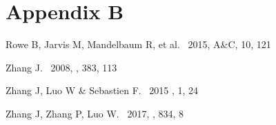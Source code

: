 \documentclass[twocolumn]{aastex62}
\begin{document}
\section{Appendix B}\label{app_b}
\begin{thebibliography}{}

Rowe B, Jarvis M, Mandelbaum R, et al. \ 2015, A\&C, 10, 121

 Zhang J. \ 2008, \mnras, 383, 113


 Zhang J, Luo W \& Sebastien F. \ 2015 \jcap, 1, 24

 Zhang J, Zhang P, Luo W. \ 2017, \apj, 834, 8

\end{thebibliography}
\end{document}
